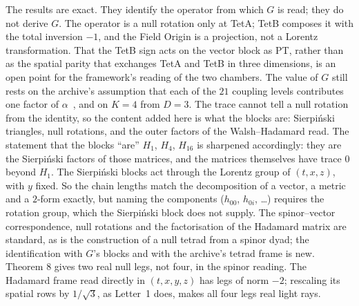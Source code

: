 \documentclass[twocolumn]{iopjournal}
\begin{document}
The results are exact. They identify the operator from which $G$ is
read; they do not derive $G$. The operator is a null rotation only at
TetA; TetB composes it with the total inversion $-1$, and the Field
Origin is a projection, not a Lorentz transformation. That the TetB
sign acts on the vector block as PT, rather than as the spatial parity
that exchanges TetA and TetB in three dimensions, is an open point for
the framework's reading of the two chambers. The value of $G$ still rests on the
archive's assumption that each of the $21$ coupling levels contributes
one factor of $\alpha$~\cite{Nelson2026gmatrix}, and on $K = 4$ from
$D = 3$. The trace cannot tell a null rotation from the identity, so
the content added here is what the blocks are: Sierpi\'nski triangles,
null rotations, and the outer factors of the Walsh--Hadamard read. The
statement that the blocks ``are'' $H_1$, $H_4$, $H_{16}$ is sharpened
accordingly: they are the Sierpi\'nski factors of those matrices, and
the matrices themselves have trace $0$ beyond $H_1$. The Sierpi\'nski
blocks act through the Lorentz group of $(t, x, z)$, with $y$ fixed.
So the chain lengths match the decomposition of a vector, a metric and
a $2$-form exactly, but naming the components ($h_{00}$, $h_{0i}$,
\dots) requires the rotation group, which the Sierpi\'nski block does
not supply. The spinor--vector correspondence, null rotations and the
factorisation of the Hadamard matrix are standard, as is the
construction of a null tetrad from a spinor dyad; the identification
with $G$'s blocks and with the archive's tetrad frame is new. Theorem 8
gives two real null legs, not four, in the spinor reading. The
Hadamard frame read directly in $(t, x, y, z)$ has legs of norm $-2$;
rescaling its spatial rows by $1/\sqrt3$, as Letter~1 does, makes all
four legs real light rays.

\end{document}

